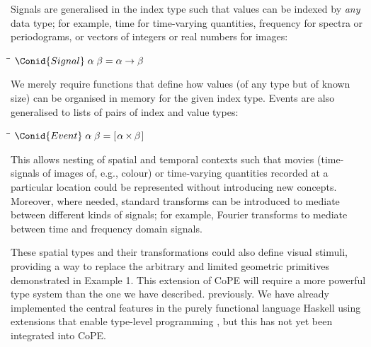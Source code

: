 Signals are generalised in the index type such that values can
be indexed by \emph{any} data type; for example, time for time-varying
quantities, frequency for spectra or periodograms, or vectors of
integers or real numbers for images:
\begin{tabbing}
\qquad\=\hspace{\lwidth}\=\hspace{\cwidth}\=\+\kill
$\Conid{Signal}\;\alpha\;\beta\mathrel{=}\alpha \to \beta$
\end{tabbing}
We merely require functions that define how values (of any type but of
known size) can be organised in memory for the given index type.
%
Events are also generalised to lists of pairs of index and value types: 
\begin{tabbing}
\qquad\=\hspace{\lwidth}\=\hspace{\cwidth}\=\+\kill
${\Conid{Event}\;\alpha\;\beta\mathrel{=}[\mskip1.5mu \alpha\;\!\!\times\!\!\;\beta\mskip1.5mu]}$
\end{tabbing}
This allows nesting of spatial and temporal contexts such that movies
(time-signals of images of, e.g., colour) or time-varying quantities
recorded at a particular location \citep[e.g., spot calcium
measurements as space-events of time-signals of
concentration;][]{DiGregorio1999} could be represented without
introducing new concepts. Moreover, where needed, standard transforms
can be introduced to mediate between different kinds of signals; for example,
Fourier transforms to mediate between time and frequency domain signals.

These spatial types and their transformations could also define visual
stimuli, providing a way to replace the arbitrary and limited
geometric primitives demonstrated in Example 1. This extension of CoPE
will require a more powerful type system than the one we have described.
previously. We have already implemented the central features in the purely
functional language Haskell using extensions that enable type-level
programming \citep{Kiselyov2010}, but this has not yet been integrated
into CoPE.

